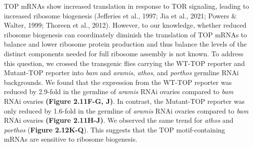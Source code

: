 \documentclass[12pt,oneside]{reedthesis}
\begin{document}

\textbf{\hfill\break
}

TOP mRNAs show increased translation in response to TOR signaling, leading to increased ribosome biogenesis (Jefferies et al., 1997; Jia et al., 2021; Powers \& Walter, 1999; Thoreen et al., 2012). However, to our knowledge, whether reduced ribosome biogenesis can coordinately diminish the translation of TOP mRNAs to balance and lower ribosome protein production and thus balance the levels of the distinct components needed for full ribosome assembly is not known. To address this question, we crossed the transgenic flies carrying the WT-TOP reporter and Mutant-TOP reporter into \emph{bam} and \emph{aramis}, \emph{athos}, and \emph{porthos} germline RNAi backgrounds. We found that the expression from the WT-TOP reporter was reduced by 2.9-fold in the germline of \emph{aramis} RNAi ovaries compared to \emph{bam} RNAi ovaries \textbf{(Figure 2.11F-G, J)}. In contrast, the Mutant-TOP reporter was only reduced by 1.6-fold in the germline of \emph{aramis} RNAi ovaries compared to \emph{bam} RNAi ovaries \textbf{(Figure 2.11H-J)}. We observed the same trend for \emph{athos} and \emph{porthos} (\textbf{Figure 2.12K-Q}). This suggests that the TOP motif-containing mRNAs are sensitive to ribosome biogenesis.
\end{document}
